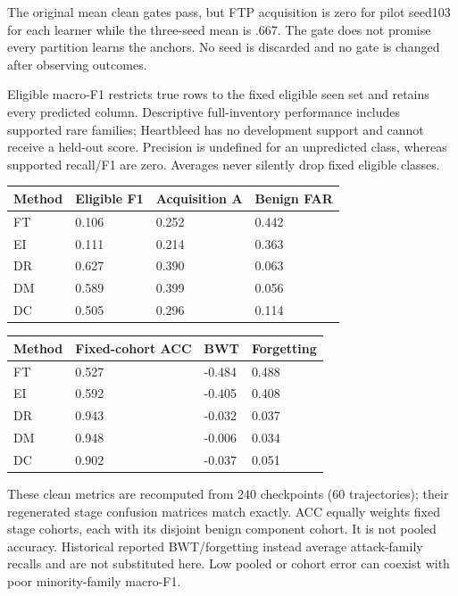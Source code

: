 \documentclass[10pt,a4paper]{article}
\begin{document}
The original mean clean gates pass, but FTP acquisition is zero for pilot seed103 for each learner while the three-seed mean is .667. The gate does not promise every partition learns the anchors. No seed is discarded and no gate is changed after observing outcomes.

Eligible macro-F1 restricts true rows to the fixed eligible seen set and retains every predicted column. Descriptive full-inventory performance includes supported rare families; Heartbleed has no development support and cannot receive a held-out score. Precision is undefined for an unpredicted class, whereas supported recall/F1 are zero. Averages never silently drop fixed eligible classes.
\begin{center}\small
\begin{tabular}{llll}
\toprule
Method & Eligible F1 & Acquisition A & Benign FAR\\
\midrule
FT & 0.106 & 0.252 & 0.442\\
EI & 0.111 & 0.214 & 0.363\\
DR & 0.627 & 0.390 & 0.063\\
DM & 0.589 & 0.399 & 0.056\\
DC & 0.505 & 0.296 & 0.114\\
\bottomrule
\end{tabular}
\end{center}
\begin{center}\small
\begin{tabular}{llll}
\toprule
Method & Fixed-cohort ACC & BWT & Forgetting\\
\midrule
FT & 0.527 & -0.484 & 0.488\\
EI & 0.592 & -0.405 & 0.408\\
DR & 0.943 & -0.032 & 0.037\\
DM & 0.948 & -0.006 & 0.034\\
DC & 0.902 & -0.037 & 0.051\\
\bottomrule
\end{tabular}
\end{center}
These clean metrics are recomputed from 240 checkpoints (60 trajectories); their regenerated stage confusion matrices match exactly. ACC equally weights fixed stage cohorts, each with its disjoint benign component cohort. It is not pooled accuracy. Historical reported BWT/forgetting instead average attack-family recalls and are not substituted here. Low pooled or cohort error can coexist with poor minority-family macro-F1.
\end{document}
